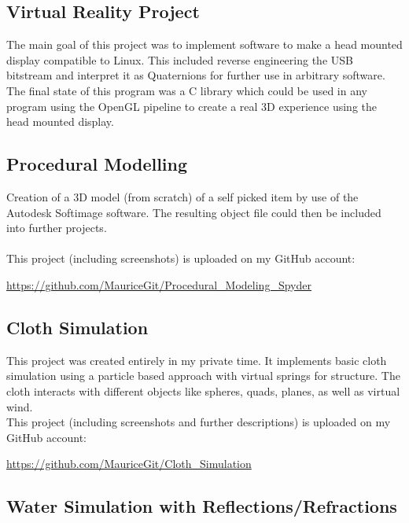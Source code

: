 \documentclass[a4paper, 12pt]{article}
\begin{document}
\subsection{Virtual Reality Project}

The main goal of this project was to implement software to make a head mounted display compatible to Linux.
This included reverse engineering the USB bitstream and interpret it as Quaternions for further use in arbitrary 
software. The final state of this program was a C library which could be used in any program using the OpenGL
pipeline to create a real 3D experience using the head mounted display.

\subsection{Procedural Modelling}

Creation of a 3D model (from scratch) of a self picked item by use of the Autodesk Softimage software.
The resulting object file could then be included into further projects.
\\
\\
This project (including screenshots) is uploaded on my GitHub account:

\begin{center}
	\url{https://github.com/MauriceGit/Procedural_Modeling_Spyder}
\end{center}

\subsection{Cloth Simulation}

This project was created entirely in my private time. It implements basic cloth simulation using a particle 
based approach with virtual springs for structure. The cloth interacts with different objects like spheres,
quads, planes, as well as virtual wind. 
\\
This project (including screenshots and further descriptions) is uploaded on my GitHub account:

\begin{center}
	\url{https://github.com/MauriceGit/Cloth_Simulation}
\end{center}

\newpage

\subsection{Water Simulation with  Reflections/Refractions}\label{subsec:water}
\end{document}

